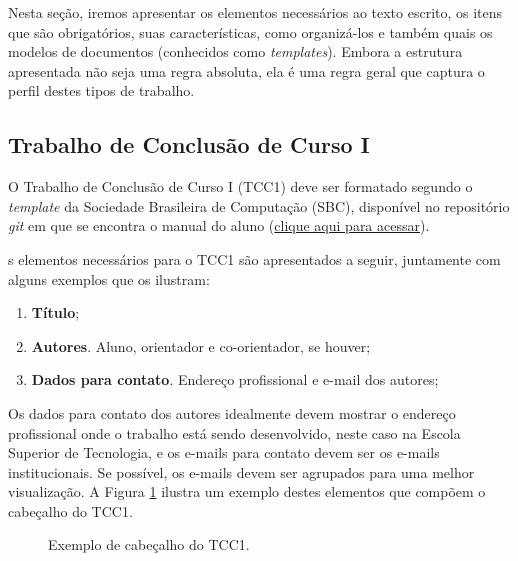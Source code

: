Nesta seção, iremos apresentar os elementos necessários ao texto escrito, os itens que são obrigatórios, suas características, como organizá-los e também quais os modelos de documentos (conhecidos como \emph{templates}). Embora a estrutura apresentada não seja uma regra absoluta, ela é uma regra geral que captura o perfil destes tipos de trabalho.

\subsection{Trabalho de Conclusão de Curso I}

O Trabalho de Conclusão de Curso I (TCC1) deve ser formatado segundo o \emph{template} da Sociedade Brasileira de Computação (SBC), disponível no repositório \emph{git} em que se encontra o manual do aluno (\href{https://github.com/elloa/manual-aluno/tree/master/templates}{clique aqui para acessar}).

s elementos necessários para o TCC1 são apresentados a seguir, juntamente com alguns exemplos que os ilustram:

\begin{enumerate}
  \item \textbf{Título};
  \item \textbf{Autores}. Aluno, orientador e co-orientador, se houver;
  \item \textbf{Dados para contato}. Endereço profissional e e-mail dos autores;
\end{enumerate}

Os dados para contato dos autores idealmente devem mostrar o endereço profissional onde o trabalho está sendo desenvolvido, neste caso na Escola Superior de Tecnologia, e os e-mails para contato devem ser os e-mails institucionais. Se possível, os e-mails devem ser agrupados para uma melhor visualização. A Figura \ref{fig:cabecalhoTCC1} ilustra um exemplo destes elementos que compõem o cabeçalho do TCC1.

\begin{figure}[h!]
  \centering
{}\caption{Exemplo de cabeçalho do TCC1.}  \label{fig:cabecalhoTCC1}
\end{figure}

